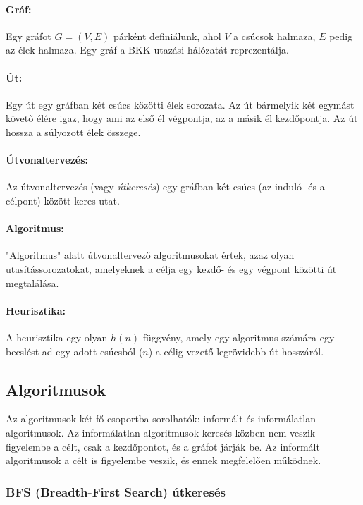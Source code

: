 \paragraph{Gráf:} Egy gráfot $G = (V, E)$ párként definiálunk, ahol $V$ a csúcsok halmaza, $E$ pedig az élek halmaza. Egy gráf a BKK utazási hálózatát reprezentálja.

\paragraph{Út:} Egy út egy gráfban két csúcs közötti élek sorozata. Az út bármelyik két egymást követő élére igaz, hogy ami az első él végpontja, az a másik él kezdőpontja. Az út hossza a súlyozott élek összege.

\paragraph{Útvonaltervezés:} Az útvonaltervezés (vagy \textit{útkeresés}) egy gráfban két csúcs (az induló- és a célpont) között keres utat.

\paragraph{Algoritmus:} "Algoritmus" alatt útvonaltervező algoritmusokat értek, azaz olyan utasítássorozatokat, amelyeknek a célja egy kezdő- és egy végpont közötti út megtalálása.

\paragraph{Heurisztika:} A heurisztika egy olyan $h(n)$ függvény, amely egy algoritmus számára egy becslést ad egy adott csúcsból ($n$) a célig vezető legrövidebb út hosszáról\cite{russell2020artificial}.

\subsection{Algoritmusok}
\label{ch:algo}

Az algoritmusok két fő csoportba sorolhatók: informált és informálatlan algoritmusok\cite{russell2020artificial}. Az informálatlan algoritmusok keresés közben nem veszik figyelembe a célt, csak a kezdőpontot, és a gráfot járják be. Az informált algoritmusok a célt is figyelembe veszik, és ennek megfelelően működnek.

\subsubsection{BFS (Breadth-First Search) útkeresés}

